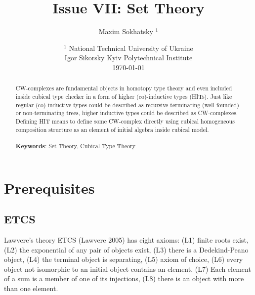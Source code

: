 \documentclass{article}
\theoremstyle{definition}
\begin{document}
\title{Issue VII: Set Theory}
\author{Maxim Sokhatsky $^1$}
\date{ $^1$ National Technical University of Ukraine \\
       \small Igor Sikorsky Kyiv Polytechnical Institute \\
       \today }

\maketitle

\begin{abstract}
CW-complexes are fundamental objects in homotopy type theory
and even included inside cubical type checker in a form of
higher (co)-inductive types (HITs).
Just like regular (co)-inductive types could be described as recursive
terminating (well-founded) or non-terminating trees,
higher inductive types could be described as CW-complexes.
Defining HIT means to define some CW-complex
directly using cubical homogeneous composition structure as an
element of initial algebra inside cubical model.
\\
\\
{\bf Keywords}: Set Theory, Cubical Type Theory
\end{abstract}
\tableofcontents

\newpage
\section{Prerequisites}

\subsection{ETCS}
Lawvere’s theory ETCS (Lawvere 2005) has eight axioms:
(L1) finite roots exist,
(L2) the exponential of any pair of objects exist,
(L3) there is a Dedekind-Peano object,
(L4) the terminal object is separating,
(L5) axiom of choice,
(L6) every object not isomorphic to an initial object contains an element,
(L7) Each element of a sum is a member of one of its injections,
(L8) there is an object with more than one element.




\end{document}
